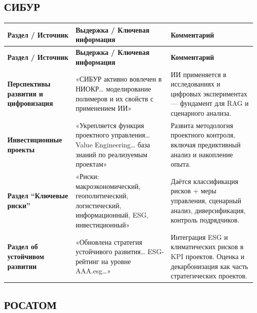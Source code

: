 \documentclass[12pt]{article}
\begin{document}
\subsection{СИБУР}
    \begin{longtable}{|p{4.5cm}|p{6cm}|p{4.5cm}|}
        \hline
        \textbf{Раздел / Источник} & \textbf{Выдержка / Ключевая информация} & \textbf{Комментарий} \\
        \hline
        \endfirsthead
        \hline
        \textbf{Раздел / Источник} & \textbf{Выдержка / Ключевая информация} & \textbf{Комментарий} \\
        \hline
        \endhead
        
        \textbf{Перспективы развития и цифровизация} &
        «СИБУР активно вовлечен в НИОКР… моделирование полимеров и их свойств с применением ИИ» &
        ИИ применяется в исследованиях и цифровых экспериментах — фундамент для RAG и сценарного анализа. \\
        \hline
        
        \textbf{Инвестиционные проекты} &
        «Укрепляется функция проектного управления… Value Engineering… база знаний по реализуемым проектам» &
        Развита методология проектного контроля, включая предиктивный анализ и накопление опыта. \\
        \hline
        
        \textbf{Раздел “Ключевые риски”} &
        «Риски: макроэкономический, геополитический, логистический, информационный, ESG, инвестиционный» &
        Даётся классификация рисков + меры управления, сценарный анализ, диверсификация, контроль подрядчиков. \\
        \hline
        
        \textbf{Раздел об устойчивом развитии} &
        «Обновлена стратегия устойчивого развития… ESG-рейтинг на уровне AAA.esg…» &
        Интеграция ESG и климатических рисков в KPI проектов. Оценка и декарбонизация как часть стратегических проектов. \\
        \hline
        
        \end{longtable}
        
    

\subsection{РОСАТОМ}
\end{document}
